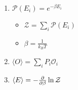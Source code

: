 

\vspace*{\fill}
\centering

\begin{enumerate}
    \item $\mathcal{P}(E_{i}) = e^{-\beta E_{i}}$ 
        \begin{itemize}
            \item $\mathcal{Z} = \sum_{i} \mathcal{P}(E_{i})$ 
            \item $\displaystyle \beta = \frac{1}{k_{B}T}$
        \end{itemize}
    \item $\langle O \rangle = \sum_{i} P_{i} \mathcal{O}_{i}$
    \item $\langle E \rangle = -\pdv{\beta} \ln{\mathcal{Z}}$
\end{enumerate}

\centering
\vspace*{\fill}

